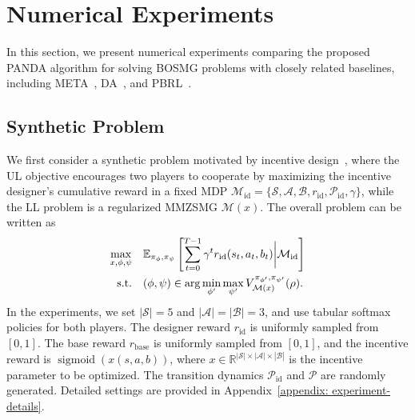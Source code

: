 \documentclass{article}
\theoremstyle{plain}
\theoremstyle{definition}
\theoremstyle{remark}
\def\E{\mathbb E}
\def\R{\mathbb R}
\def\cA{\mathcal A}
\def\cB{\mathcal B}
\def\cM{\mathcal M}
\def\cP{\mathcal P}
\def\cS{\mathcal S}
\begin{document}
\vspace{-2mm}

\vspace{-2mm}
\section{Numerical Experiments}
\vspace{-2mm}
In this section, we present numerical experiments comparing the proposed PANDA algorithm for solving BOSMG problems with closely related baselines, including META~\cite{yang2022adaptive}, DA~\cite{wang2023differentiable}, and PBRL~\cite{shen2025principled}.

\vspace{-2mm}
\subsection{Synthetic Problem}
\vspace{-2mm}


\label{sec: synthetic-experiment}
We first consider a synthetic problem motivated by incentive design~\citep{yang2020learning}, where the UL objective encourages two players to cooperate by maximizing the incentive designer’s cumulative reward in a fixed MDP $\cM_{\mathrm{id}}=\{\cS,\cA,\cB,r_{\mathrm{id}},\cP_{\mathrm{id}},\gamma \}$, while the LL problem is a regularized MMZSMG $\cM(x)$. The overall problem can be written as
\begin{subequations}
\vspace{-2mm}
\begin{align} 
\max_{x, \phi,\psi}& \quad \E_{\pi_\phi,\pi_\psi} \left[ \sum_{t=0}^{T-1} \gamma^t r_{\mathrm{id}}(s_t,a_t,b_t) \bigg| \cM_{\mathrm{id}} \right] \notag    \\  
\text{s.t.} & \quad (\phi,\psi) \in \arg\min_{\phi'} \max_{\psi'} \notag V^{\pi_{\phi'},\pi_{\psi'}}_{\cM(x)}(\rho).
\vspace{-2mm}
\end{align}
\end{subequations}
In the experiments, we set $|\cS|=5$ and $|\cA|=|\cB|=3$, and use tabular softmax policies for both players. The designer reward $r_{\mathrm{id}}$ is uniformly sampled from $[0,1]$. The base reward $r_{\mathrm{base}}$ is uniformly sampled from $[0,1]$, and the incentive reward is $\operatorname{sigmoid}(x(s,a,b))$, where $x \in \R^{|\cS|\times|\cA|\times|\cB|}$ is the incentive parameter to be optimized. The transition dynamics $\cP_{\mathrm{id}}$ and $\cP$ are randomly generated. Detailed settings are provided in Appendix~\ref{appendix: experiment-details}.
\end{document}
